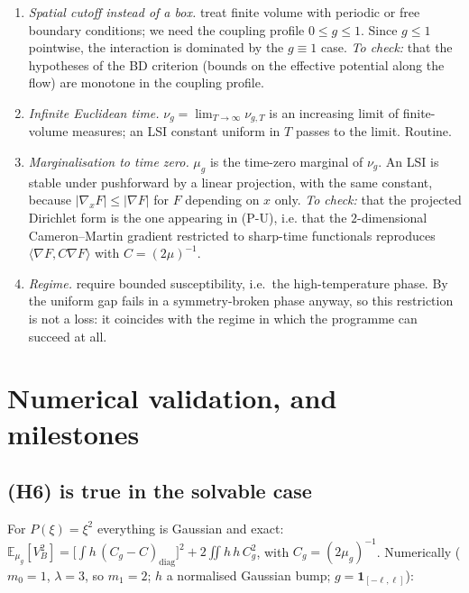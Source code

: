 \documentclass[11pt,a4paper]{article}
\theoremstyle{plain}
\theoremstyle{definition}
\newcommand{\E}{\mathbb{E}}
\newcommand{\ip}[2]{\langle #1,#2\rangle}
\begin{document}
\begin{enumerate}
\item[\textbf{(T1)}] \emph{Spatial cutoff instead of a box.} \cite{BD} treat finite volume with
      periodic or free boundary conditions; we need the coupling profile $0\le g\le1$. Since
      $g\le1$ pointwise, the interaction is dominated by the $g\equiv1$ case. \emph{To check:}
      that the hypotheses of the BD criterion (bounds on the effective potential along the flow)
      are monotone in the coupling profile.
\item[\textbf{(T2)}] \emph{Infinite Euclidean time.} $\nu_g=\lim_{T\to\infty}\nu_{g,T}$ is an
      increasing limit of finite-volume measures; an LSI constant uniform in $T$ passes to the
      limit. Routine.
\item[\textbf{(T3)}] \emph{Marginalisation to time zero.} $\mu_g$ is the time-zero marginal of
      $\nu_g$. An LSI is stable under pushforward by a linear projection, with the same constant,
      because $|\nabla_x F|\le|\nabla F|$ for $F$ depending on $x$ only. \emph{To check:} that the
      projected Dirichlet form is the one appearing in (P-U), i.e. that the $2$-dimensional
      Cameron--Martin gradient restricted to sharp-time functionals reproduces
      $\ip{\nabla F}{C\nabla F}$ with $C=(2\mu)^{-1}$.
\item[\textbf{(T4)}] \emph{Regime.} \cite{BD} require bounded susceptibility, i.e.\ the
      high-temperature phase. By \cite[Thm.~4.2]{M3} the uniform gap fails in a symmetry-broken
      phase anyway, so this restriction is not a loss: it coincides with the regime in which the
      programme can succeed at all.
\end{enumerate}

\section{Numerical validation, and milestones}

\subsection*{(H6) is true in the solvable case}

For $P(\xi)=\xi^2$ everything is Gaussian and exact:
$\E_{\mu_g}[V_B^2]=\bigl[\int h\,(C_g-C)_{\mathrm{diag}}\bigr]^2+2\iint h\,h\,C_g^2$, with
$C_g=(2\mu_g)^{-1}$. Numerically ($m_0=1$, $\lambda=3$, so $m_1=2$; $h$ a normalised Gaussian
bump; $g=\mathbf 1_{[-\ell,\ell]}$):
\end{document}
